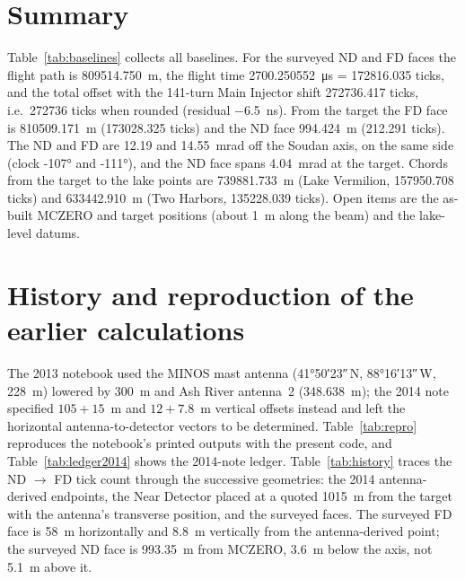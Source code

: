 \documentclass[11pt,letterpaper]{article}
\newcommand{\ND}{ND}
\newcommand{\FD}{FD}
\begin{document}
\section{Summary}
Table~\ref{tab:baselines} collects all baselines.  For the surveyed \ND{} and \FD{} faces the flight path is \SI{809514.750}{m}, the flight time \SI{2700.250552}{\micro s} = \num{172816.035} ticks, and the total offset with the 141-turn Main Injector shift \num{272736.417} ticks, i.e.\ \num{272736} ticks when rounded (residual \SI{-6.5}{ns}).  From the target the \FD{} face is \SI{810509.171}{m} (\num{173028.325} ticks) and the \ND{} face \SI{994.424}{m} (\num{212.291} ticks).  The \ND{} and \FD{} are \num{12.19} and \num{14.55}~mrad off the Soudan axis, on the same side (clock \ang{-107} and \ang{-111}), and the \ND{} face spans \num{4.04}~mrad at the target.  Chords from the target to the lake points are \SI{739881.733}{m} (Lake Vermilion, \num{157950.708} ticks) and \SI{633442.910}{m} (Two Harbors, \num{135228.039} ticks).  Open items are the as-built MCZERO and target positions (about \SI{1}{m} along the beam) and the lake-level datums.

\begin{table}[htbp]\centering\scriptsize
\caption{All baselines of the configuration.  ``total'' adds the MI shift; the last column is the opening angle between the chord and the beam axis.}
\label{tab:baselines}
\end{table}

\appendix
\section{History and reproduction of the earlier calculations}
\label{app:history}
The 2013 notebook \cite{norman2013nb} used the MINOS mast antenna (\ang{41;50;23}\,N, \ang{88;16;13}\,W, \SI{228}{m}) lowered by \SI{300}{m} and Ash River antenna~2 (\SI{348.638}{m}); the 2014 note \cite{norman2014} specified $105+15$~m and $12+7.8$~m vertical offsets instead and left the horizontal antenna-to-detector vectors to be determined.  Table~\ref{tab:repro} reproduces the notebook's printed outputs with the present code, and Table~\ref{tab:ledger2014} shows the 2014-note ledger.  Table~\ref{tab:history} traces the \ND{} $\to$ \FD{} tick count through the successive geometries: the 2014 antenna-derived endpoints, the Near Detector placed at a quoted \SI{1015}{m} from the target with the antenna's transverse position, and the surveyed faces.  The surveyed \FD{} face is \SI{58}{m} horizontally and \SI{8.8}{m} vertically from the antenna-derived point; the surveyed \ND{} face is \SI{993.35}{m} from MCZERO, \SI{3.6}{m} below the axis, not \SI{5.1}{m} above it.
\end{document}
